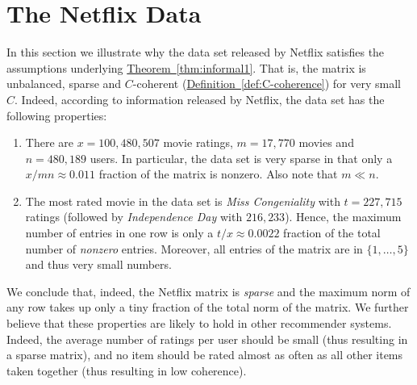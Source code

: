 \documentclass[letterpaper,11pt]{article}
\theoremstyle{definition}
\newcommand{\definitionref}[1]{\hyperref[def:#1]{Definition~\ref{def:#1}}}
\newcommand{\sectionlabel}[1]{\label{sec:#1}}
\newcommand{\theoremref}[1]{\hyperref[thm:#1]{Theorem~\ref{thm:#1}}}
\begin{document}
\section{The Netflix Data}
\sectionlabel{netflix}
In this section we illustrate why the data set released by Netflix satisfies the
assumptions underlying \theoremref{informal1}. That is, the matrix is
unbalanced, sparse and $C$-coherent (\definitionref{C-coherence}) for very
small $C.$ Indeed, according to information released by Netflix, the data set
has the following properties:
\begin{enumerate}
\item There are $x=100,480,507$ movie ratings,
$m=17,770$ movies and $n=480,189$ users. In particular, the data set is very sparse
in that only a $x/mn\approx0.011$ fraction of the matrix is nonzero. Also note
that $m\ll n.$
\item The most rated movie in the data set is \emph{Miss Congeniality} with $t=227,715$
ratings (followed by \emph{Independence Day} with $216,233$). Hence, the maximum
number of entries in one row is only a $t/x\approx0.0022$ fraction of the
total number of \emph{nonzero} entries. 
Moreover, all entries of the matrix are in $\{1,\dots,5\}$ and thus very small
numbers.
\end{enumerate}
We conclude that, indeed, the Netflix matrix is \emph{sparse} and the maximum
norm of any row takes up only a tiny fraction of the total norm of the matrix.
We further believe that these properties are likely to hold in other
recommender systems.  Indeed, the average number of ratings per user should be
small (thus resulting in a sparse matrix), and no item should be rated almost
as often as all other items taken together (thus resulting in low coherence).
\end{document}
